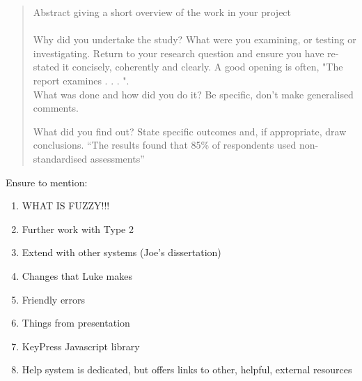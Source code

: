 \documentclass[a4paper,twoside,notitlepage,11pt]{article}
\begin{document}
%
%
%
%

\pagestyle{empty}


%
%
%
%

\newpage
\begin{abstract}
{\color{red} Abstract giving a short overview of the work in your project
\\
\\
Why did you undertake the study? 
What were you examining, or testing or investigating. 
Return to your research question and ensure you have re-stated it concisely, coherently and clearly. A good opening is often, "The report examines . . . ".
\\
What was done and how did you do it? Be specific, don’t make generalised comments. 


What did you find out? State specific outcomes and, if appropriate, draw conclusions. ``The results found that 85\% of respondents used non-standardised assessments''

}
\end{abstract}

\begin{large}
Ensure to mention:
\begin{enumerate}
	\item WHAT IS FUZZY!!!
	\item Further work with Type 2
	\item Extend with other systems (Joe's dissertation)
	\item Changes that Luke makes
	\item Friendly errors
	\item Things from presentation
	\item KeyPress Javascript library
	\item Help system is dedicated, but offers links to other, helpful, external resources
\end{enumerate}


\end{large}

%
%
%
%

\newpage
{}
\tableofcontents

%
%
%
%

\newpage
\pagestyle{plain}
\setcounter{page}{1}


\end{document}
